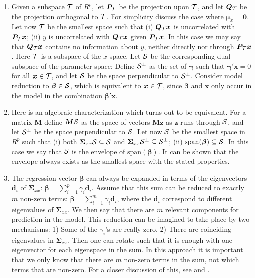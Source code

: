 \documentclass[a4paper, 11pt]{article}
\begin{document}
\begin{enumerate}[label=\Alph*.]

\item Given a subspace $\cal{T}$ of $R^p$, let $\bm{P}_{\cal{T}}$ be the projection upon $\cal{T}$, and let $\bm{Q}_{\cal{T}}$ be the projection orthogonal to $\cal{T}$. For simplicity discuss the case where $\bm{\mu}_x =\bm{0}$. Let now $\cal{T}$ be the smallest space such that (i) $\bm{Q}_{\cal{T}}\bm{x}$ is uncorrelated with $\bm{P}_{\cal{T}}\bm{x}$; (ii) $y$ is uncorrelated with $\bm{Q}_{\cal{T}}\bm{x}$ given $\bm{P}_{\cal{T}}\bm{x}$. In this case we may say that $\bm{Q}_{\cal{T}}\bm{x}$ contains no information about $y$, neither directly nor through $\bm{P}_{\cal{T}}\bm{x}$. Here $\cal{T}$ is a subspace of the $x$-space. Let $\cal{S}$ be the corresponding dual subspace of the parameter-space: Define $\cal{S}^\perp$ as the set of $\bm{\gamma}$ such that $\bm{\gamma}'\bm{x}=0$ for all $\bm{x}\in\cal{T}$, and let $\cal{S}$ be the space perpendicular to $\cal{S}^\perp$. Consider model reduction to $\bm{\beta}\in\cal{S}$, which is equivalent to $\bm{x}\in \cal{T}$, since $\bm{\beta}$ and $\bm{x}$ only occur in the model in the combination $\bm{\beta}'\bm{x}$.
  \smallskip

\item  Here is an algebraic characterization which turns out to be equivalent. For a matrix $\bm{M}$ define $\bm{M}\cal{S}$ as the space of vectors $\bm{Mz}$ as $\bm{z}$ runs through $\cal{S}$, and let $\cal{S}^\perp$ be
  the space perpendicular to $\cal{S}$. Let now $\cal{S}$ be the smallest space in $R^p$ such that (i) both $\bm{\Sigma}_{xx}\cal{S}\subseteq\cal{S}$ and
  $\bm{\Sigma}_{xx}\cal{S}^\perp\subseteq\cal{S}^\perp$; (ii) $\mathrm{span}(\bm{\beta})\subseteq\cal{S}$. In this case we say that $\cal{S}$
  is the envelope of $\mathrm{span}(\bm{\beta})$. It can be shown \citep{cook2010envelope} that the envelope always exists as the smallest space with the stated properties.
  \smallskip

\item The regression vector $\bm{\beta}$ can always be expanded in terms of the eigenvectors $\bm{d}_{i}$ of $\bm{\Sigma}_{xx}$:
  $\bm{\beta}=\sum_{i=1}^p \gamma_{i}\bm{d}_{i}$. Assume that this sum can be reduced to exactly $m$ non-zero terms:
  $\bm{\beta}=\sum_{i=1}^m \gamma_{i}\bm{d}_{i}$, where the $\bm{d}_i$ correspond to different eigenvalues of $\bm{\Sigma}_{xx}$. We then say that there are $m$ relevant components for prediction in the model. This reduction can be imagined to take place by two mechanisms: 1) Some of the $\gamma_i$'s are really zero. 2) There are coinciding eigenvalues in $\bm{\Sigma}_{xx}$. Then one can rotate such that it is enough with one eigenvector for each eigenspace in the sum. In this approach it is important that we only know that there are $m$ non-zero terms in the sum, not which  terms that are non-zero. For a closer discussion of this, see \citet{naes1993relevant} and \citet{helland1994comparison}.
  \smallskip


\end{enumerate}
\end{document}
